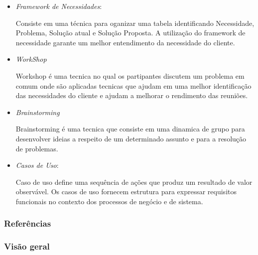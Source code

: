 \begin{itemize}
	\item \textit{Framework de Necessidades}:

		Consiste em uma técnica para oganizar uma tabela identificando Necessidade, Problema, Solução atual e Solução Proposta. A utilização do framework de necessidade garante um melhor entendimento da necessidade do cliente.
 
	\item \textit{WorkShop}

		 Workshop é uma tecnica no qual os partipantes discutem um problema em comum onde são aplicadas tecnicas que ajudam em uma melhor identificação das necessidades do cliente e ajudam a melhorar o rendimento das reuniões.

	\item \textit{Brainstorming}

		 Brainstorming é uma tecnica que consiste em uma dinamica de grupo para desenvolver ideias a respeito de um determinado assunto e para a resolução de problemas.

	\item \textit{Casos de Uso}:

		 Caso de uso define uma sequência de ações que produz um resultado de valor observável. Os casos de uso fornecem estrutura para expressar requisitos funcionais no contexto dos processos de negócio e de sistema.
\end{itemize}

\subsubsection{Referências}

\subsubsection{Visão geral}

